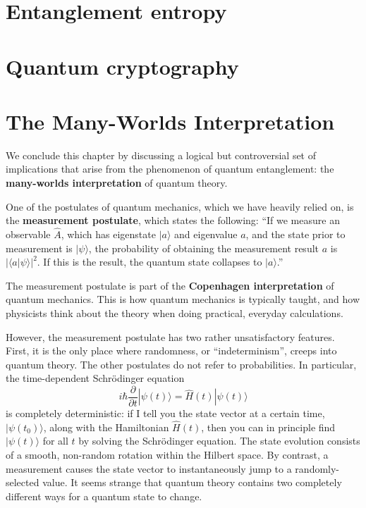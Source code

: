 \documentclass[pra,11pt]{revtex4}
\begin{document}
\section{Entanglement entropy}

\section{Quantum cryptography}

\section{The Many-Worlds Interpretation}

We conclude this chapter by discussing a logical but controversial set
of implications that arise from the phenomenon of quantum
entanglement: the \textbf{many-worlds interpretation} of quantum
theory.

One of the postulates of quantum mechanics, which we have heavily
relied on, is the \textbf{measurement postulate}, which states the
following: ``If we measure an observable $\hat{A}$, which has
eigenstate $|a\rangle$ and eigenvalue $a$, and the state prior to
measurement is $|\psi\rangle$, the probability of obtaining the
measurement result $a$ is $|\langle a | \psi\rangle|^2$.  If this is
the result, the quantum state collapses to $|a\rangle$.''

The measurement postulate is part of the \textbf{Copenhagen
  interpretation} of quantum mechanics.  This is how quantum mechanics
is typically taught, and how physicists think about the theory when
doing practical, everyday calculations.

However, the measurement postulate has two rather unsatisfactory
features.  First, it is the only place where randomness, or
``indeterminism'', creeps into quantum theory.  The other postulates
do not refer to probabilities.  In particular, the time-dependent
Schr\"odinger equation
$$i\hbar\frac{\partial}{\partial t}|\psi(t)\rangle = \hat{H}(t) |\psi(t)\rangle$$
is completely deterministic: if I tell you the state vector at a
certain time, $|\psi(t_0)\rangle$, along with the Hamiltonian
$\hat{H}(t)$, then you can in principle find $|\psi(t)\rangle$ for all
$t$ by solving the Schr\"odinger equation.  The state evolution
consists of a smooth, non-random rotation within the Hilbert space.
By contrast, a measurement causes the state vector to instantaneously
jump to a randomly-selected value.  It seems strange that quantum
theory contains two completely different ways for a quantum state to
change.
\end{document}
